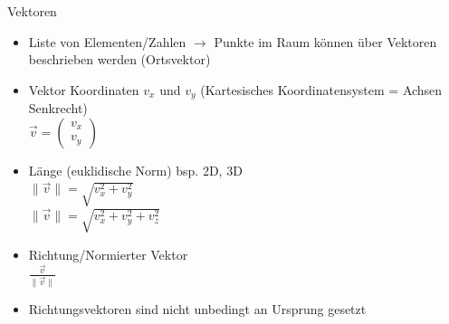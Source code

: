 \documentclass[10pt,aspectratio=169]{beamer}
\begin{document}
  \begin{frame}{Vektoren}
    \begin{minipage}{10cm}
      \begin{itemize}
        \item Liste von Elementen/Zahlen $\rightarrow$ Punkte im Raum können über Vektoren beschrieben werden (Ortsvektor)
        \item Vektor Koordinaten $v_x$ und $v_y$ (Kartesisches Koordinatensystem = Achsen Senkrecht)\\\vspace{0.2cm} 
        \hspace{0.3cm}$\vec{v} = \begin{pmatrix} v_x\\ v_y\end{pmatrix}$
        \vspace{0.2cm}
        \item Länge (euklidische Norm) bsp. 2D, 3D\\
        \hspace{0.3cm}$\|\vec{v}\| =  \sqrt{v_x^2 + v_y^2}$\\
        \hspace{0.3cm}$\|\vec{v}\| =  \sqrt{v_x^2 + v_y^2 + v_z^2}$
        \vspace{0.2cm}
        \item Richtung/Normierter Vektor\\
        \hspace{0.25cm}\Large$\frac{\vec{v}}{\|\vec{v}\|}$\normalsize
        \item Richtungsvektoren sind nicht unbedingt an Ursprung gesetzt
      \end{itemize}  
    \end{minipage}
    \begin{minipage}[c]{3cm}
    \end{minipage}
  \end{frame}
\end{document}
